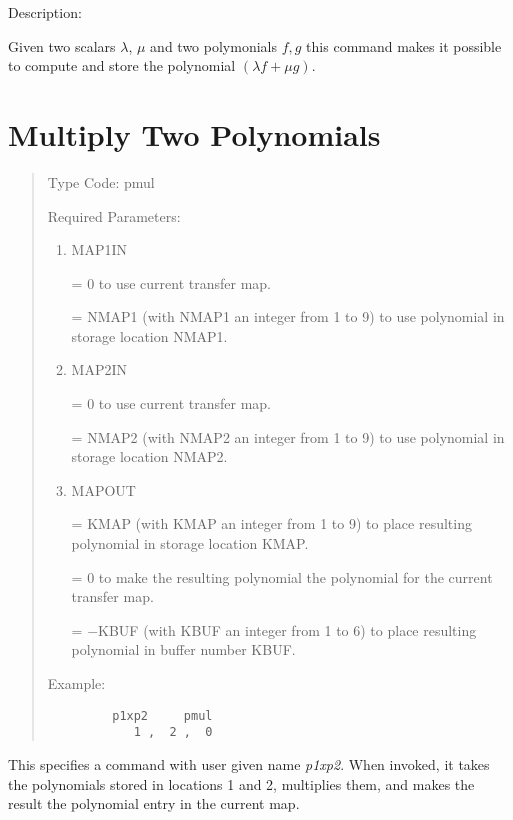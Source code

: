 \vspace{5mm}
     Description:
\vspace{2mm}

Given two scalars $\lambda$, $\mu$ and two polymonials $f,g$ this command makes it possible to compute and store the polynomial $(\lambda f + \mu g)$.

\newpage
\section{Multiply Two Polynomials} 
\begin{quotation}
\noindent     Type Code:  pmul
\vspace{5mm}

\noindent     Required Parameters:
\begin{enumerate}
      \item  MAP1IN

             = 0 to use current transfer map.

             = NMAP1 (with NMAP1 an integer from 1 to 9) to use polynomial in
               \hspace*{1em} storage location NMAP1.

      \item  MAP2IN

             = 0 to use current transfer map.

             = NMAP2 (with NMAP2 an integer from 1 to 9) to use polynomial in
               \hspace*{1em} storage location NMAP2.

      \item  MAPOUT

             = KMAP (with KMAP an integer from 1 to 9) to place resulting
               polynomial \hspace*{1em}in storage location KMAP.

             = 0 to make the resulting polynomial the polynomial for the current transfer \hspace*{1em}map.

             = $-$KBUF (with KBUF an integer from 1 to 6) to place resulting
               polynomial \hspace*{1em}in buffer number KBUF.
\end{enumerate}

\vspace{5mm}
\noindent Example:
\begin{verbatim}
         p1xp2     pmul
            1 ,  2 ,  0
\end{verbatim}
\end{quotation}
This specifies a command with user given name {\em p1xp2}.  When invoked, it takes the polynomials stored in locations 1 and 2, multiplies them, and makes the result the polynomial entry in the current map.

